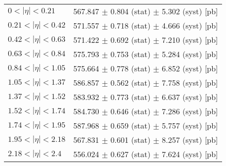\begin{tabular}{lc}
\hline
\hline
$0 < |\eta| <0.21$             & 567.847 $\pm$ 0.804 (stat) $\pm$ 5.302 (syst) [pb]  \\
$0.21 < |\eta| <0.42$          & 571.557 $\pm$ 0.718 (stat) $\pm$ 4.666 (syst) [pb]  \\
$0.42 < |\eta| <0.63$          & 571.422 $\pm$ 0.692 (stat) $\pm$ 7.210 (syst) [pb]  \\
$0.63 < |\eta| <0.84$          & 575.793 $\pm$ 0.753 (stat) $\pm$ 5.284 (syst) [pb]  \\
$0.84 < |\eta| <1.05$          & 575.664 $\pm$ 0.778 (stat) $\pm$ 6.852 (syst) [pb]  \\
$1.05 < |\eta| <1.37$          & 586.857 $\pm$ 0.562 (stat) $\pm$ 7.758 (syst) [pb]  \\
$1.37 < |\eta| <1.52$          & 583.932 $\pm$ 0.773 (stat) $\pm$ 6.637 (syst) [pb]  \\
$1.52 < |\eta| <1.74$          & 584.730 $\pm$ 0.646 (stat) $\pm$ 7.286 (syst) [pb]  \\
$1.74 < |\eta| <1.95$          & 587.968 $\pm$ 0.659 (stat) $\pm$ 5.757 (syst) [pb]  \\
$1.95 < |\eta| <2.18$          & 567.831 $\pm$ 0.601 (stat) $\pm$ 8.257 (syst) [pb]  \\
$2.18 < |\eta| <2.4$           & 556.024 $\pm$ 0.627 (stat) $\pm$ 7.624 (syst) [pb]  \\
\hline
\hline
\end{tabular}
